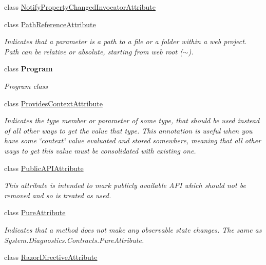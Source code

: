 \begin{DoxyCompactItemize}
class \mbox{\hyperlink{class_r_f_storage_1_1_notify_property_changed_invocator_attribute}{Notify\+Property\+Changed\+Invocator\+Attribute}}
\item 
class \mbox{\hyperlink{class_r_f_storage_1_1_path_reference_attribute}{Path\+Reference\+Attribute}}
\begin{DoxyCompactList}\small\item\em Indicates that a parameter is a path to a file or a folder within a web project. Path can be relative or absolute, starting from web root ($\sim$). \end{DoxyCompactList}\item 
class {\bfseries Program}
\begin{DoxyCompactList}\small\item\em Program class \end{DoxyCompactList}\item 
class \mbox{\hyperlink{class_r_f_storage_1_1_provides_context_attribute}{Provides\+Context\+Attribute}}
\begin{DoxyCompactList}\small\item\em Indicates the type member or parameter of some type, that should be used instead of all other ways to get the value that type. This annotation is useful when you have some \char`\"{}context\char`\"{} value evaluated and stored somewhere, meaning that all other ways to get this value must be consolidated with existing one. \end{DoxyCompactList}\item 
class \mbox{\hyperlink{class_r_f_storage_1_1_public_a_p_i_attribute}{Public\+A\+P\+I\+Attribute}}
\begin{DoxyCompactList}\small\item\em This attribute is intended to mark publicly available A\+PI which should not be removed and so is treated as used. \end{DoxyCompactList}\item 
class \mbox{\hyperlink{class_r_f_storage_1_1_pure_attribute}{Pure\+Attribute}}
\begin{DoxyCompactList}\small\item\em Indicates that a method does not make any observable state changes. The same as {\ttfamily System.\+Diagnostics.\+Contracts.\+Pure\+Attribute}. \end{DoxyCompactList}\item 
class \mbox{\hyperlink{class_r_f_storage_1_1_razor_directive_attribute}{Razor\+Directive\+Attribute}}
\item 

\end{DoxyCompactItemize}
